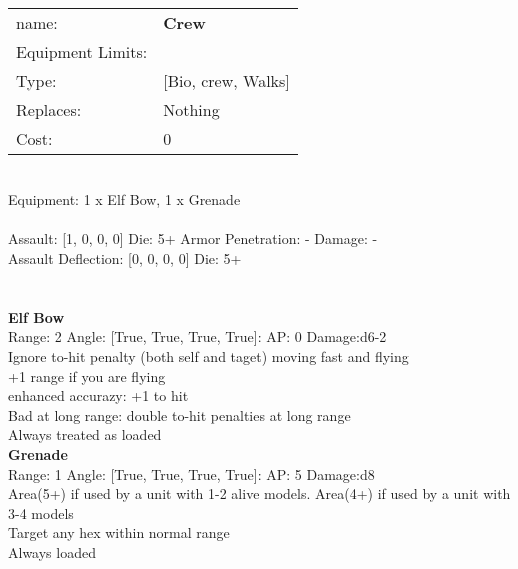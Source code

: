  
\ \\

\noindent
\begin{tabular}{ll}
name: &{\bf Crew } \\
Equipment Limits: & \\
Type: &[Bio, crew, Walks] \\
Replaces: &Nothing \\
Cost: & 0\\
\end{tabular}
\ \\
Equipment: 1 x Elf Bow, 1 x Grenade \\
\ \\
Assault: [1, 0, 0, 0] Die: 5+ Armor Penetration: - Damage: - \\
Assault Deflection: [0, 0, 0, 0] Die: 5+\\
\indent  
\ \\

\ \\
{\bf Elf Bow } \\



Range: 2  Angle: [True, True, True, True]: AP: 0 Damage:d6-2 \\
Ignore to-hit penalty (both self and taget) moving fast and flying\\ 
+1 range if you are flying\\ 
enhanced accurazy: +1 to hit\\ 
Bad at long range: double to-hit penalties at long range\\ 
Always treated as loaded\\ 




{\bf Grenade } \\



Range: 1  Angle: [True, True, True, True]: AP: 5 Damage:d8 \\
Area(5+) if used by a unit with 1-2 alive models. Area(4+) if used by a unit with 3-4 models\\ 
Target any hex within normal range\\ 
Always loaded\\ 




 
\ \\




